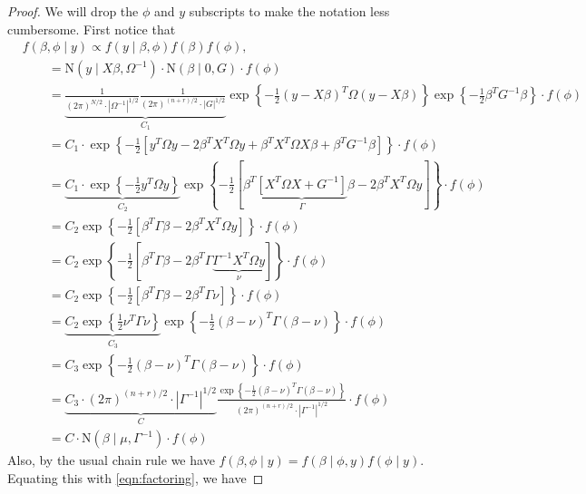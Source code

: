 \documentclass[10pt]{article}
\begin{document}
\begin{proof}
We will drop the $\phi$ and $y$ subscripts to make the notation less cumbersome. First notice that
%
\begin{align}
&f(\beta, \phi \mid y) \propto f(y \mid \beta, \phi) f(\beta) f(\phi), \\
&\qquad= \text{N}(y \mid X \beta, \Omega^{-1}) \cdot \text{N}(\beta \mid 0, G) \cdot f(\phi) \\
%
&\qquad= \underbrace{\frac{1}{ (2\pi)^{N/2} \cdot |\Omega^{-1}|^{1/2}}
\frac{1}{ (2\pi)^{(n+r)/2} \cdot |G|^{1/2}}}_{C_1}
\exp\left\{ -\frac{1}{2} (y - X \beta)^T \Omega (y - X \beta) \right\}
\exp\left\{ -\frac{1}{2} \beta^T G^{-1} \beta \right\}
\cdot f(\phi) \\
%
&\qquad= C_1 \cdot
\exp\left\{ -\frac{1}{2} \left[ y^T \Omega y - 2 \beta^T X^T \Omega y + \beta^T X^T \Omega X \beta + \beta^T G^{-1} \beta\right] \right\}
\cdot f(\phi) \\
%
&\qquad= \underbrace{C_1 \cdot \exp\left\{ -\frac{1}{2} y^T \Omega y \right\}}_{C_2}
\exp\left\{ -\frac{1}{2} \left[ \beta^T \underbrace{[X^T \Omega X + G^{-1}]}_{\Gamma} \beta - 2 \beta^T X^T \Omega y \right] \right\}
\cdot f(\phi) \\
%
&\qquad= C_2
\exp\left\{ -\frac{1}{2} \left[ \beta^T \Gamma \beta - 2 \beta^T X^T \Omega y \right] \right\}
\cdot f(\phi) \\
%
&\qquad= C_2
\exp\left\{ -\frac{1}{2} \left[ \beta^T \Gamma \beta - 2 \beta^T \Gamma \underbrace{\Gamma^{-1} X^T \Omega y}_{\nu} \right] \right\}
\cdot f(\phi) \\
%
&\qquad= C_2
\exp\left\{ -\frac{1}{2} \left[ \beta^T \Gamma \beta - 2 \beta^T \Gamma \nu \right] \right\}
\cdot f(\phi) \\
%
&\qquad= \underbrace{C_2 \exp\left\{ \frac{1}{2} \nu^T \Gamma \nu \right\}}_{C_3}
\exp\left\{ -\frac{1}{2} (\beta - \nu)^T \Gamma (\beta - \nu) \right\}
\cdot f(\phi) \\
%
&\qquad= C_3
\exp\left\{ -\frac{1}{2} (\beta - \nu)^T \Gamma (\beta - \nu) \right\}
\cdot f(\phi) \\
%
&\qquad= \underbrace{C_3 \cdot (2\pi)^{(n+r)/2} \cdot |\Gamma^{-1}|^{1/2}}_{C}
\frac{ \exp\left\{ -\frac{1}{2} (\beta - \nu)^T \Gamma (\beta - \nu) \right\} }{ (2\pi)^{(n+r)/2} \cdot |\Gamma^{-1}|^{1/2} }
\cdot f(\phi) \\
%
&\qquad= C \cdot
\text{N}(\beta \mid \mu, \Gamma^{-1})
\cdot f(\phi)
\label{eqn:factoring}
\end{align}
%
Also, by the usual chain rule we have $f(\beta, \phi \mid y) = f(\beta \mid \phi, y) f(\phi \mid y)$. Equating this with \eqref{eqn:factoring}, we have

\end{proof}
\end{document}
